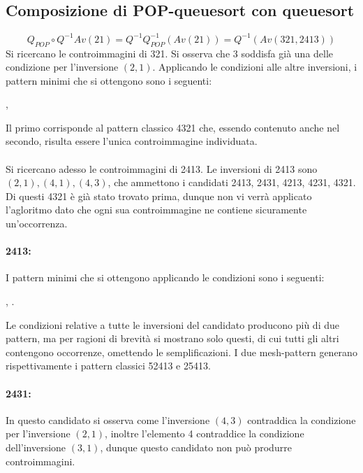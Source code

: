 \subsection{Composizione di {POP-queuesort} con {queuesort}}
$$Q_{POP}\circ Q^{-1}Av(21) = Q^{-1}Q_{POP}^{-1}(Av(21)) = Q^{-1}(Av(321, 2413))$$
Si ricercano le controimmagini di 321. Si osserva che 3 soddisfa gi\`a una delle condizione per l'inversione $(2,1)$. Applicando le condizioni alle altre inversioni, i pattern minimi che si ottengono sono i seguenti:
\begin{center}
, 
\end{center}
Il primo corrisponde al pattern classico 4321 che, essendo contenuto anche nel secondo, risulta essere l'unica controimmagine individuata.\\\\
Si ricercano adesso le controimmagini di 2413. Le inversioni di 2413 sono $(2,1),(4,1),(4,3)$, che ammettono i candidati 2413, 2431, 4213, 4231, 4321. Di questi 4321 \`e gi\`a stato trovato prima, dunque non vi verr\`a applicato l'agloritmo dato che ogni sua controimmagine ne contiene sicuramente un'occorrenza.
\paragraph*{2413:} I pattern minimi che si ottengono applicando le condizioni sono i seguenti:
\begin{center}
, 
.
\end{center}
Le condizioni relative a tutte le inversioni del candidato producono pi\`u di due pattern, ma per ragioni di brevit\`a si mostrano solo questi, di cui tutti gli altri contengono occorrenze, omettendo le semplificazioni. I due mesh-pattern generano rispettivamente i pattern classici 52413 e 25413.
\paragraph*{2431:} In questo candidato si osserva come l'inversione $(4,3)$ contraddica la condizione per l'inversione $(2,1)$, inoltre l'elemento 4 contraddice la condizione dell'inversione $(3,1)$, dunque questo candidato non pu\`o produrre controimmagini.
